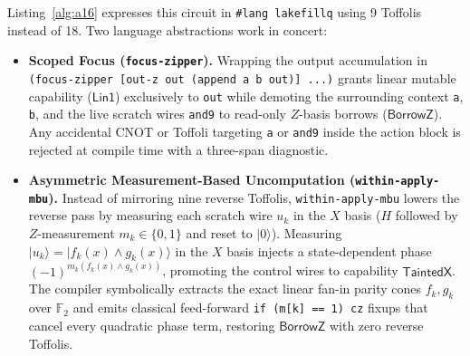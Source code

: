 \documentclass[acmsmall,screen,anonymous]{acmart}
\DeclareRobustCommand{\_}{\ifmmode\text{\char95}\else\char95\penalty0\relax\fi}
\theoremstyle{plain}
\newcommand{\CapBorrowZ}{\ensuremath{\mathsf{BorrowZ}}}
\newcommand{\CapTaintedX}{\ensuremath{\mathsf{TaintedX}}}
\newcommand{\CapLin}{\ensuremath{\mathsf{Lin1}}}
\begin{document}
Listing~\ref{alg:a16} expresses this circuit in \texttt{\#lang lakefillq} using 9 Toffolis instead of 18. Two language abstractions work in concert:
\begin{itemize}
  \item \textbf{Scoped Focus (\texttt{focus-zipper}).} Wrapping the output accumulation in \texttt{(focus-zipper [out-z out (append a b out)] ...)} grants linear mutable capability ($\CapLin$) exclusively to \texttt{out} while demoting the surrounding context \texttt{a}, \texttt{b}, and the live scratch wires \texttt{and9} to read-only $Z$-basis borrows ($\CapBorrowZ$). Any accidental CNOT or Toffoli targeting \texttt{a} or \texttt{and9} inside the action block is rejected at compile time with a three-span diagnostic.
  \item \textbf{Asymmetric Measurement-Based Uncomputation (\texttt{within-apply-mbu}).} Instead of mirroring nine reverse Toffolis, \texttt{within-apply-mbu} lowers the reverse pass by measuring each scratch wire $u_k$ in the $X$ basis ($H$ followed by $Z$-measurement $m_k \in \{0,1\}$ and reset to $|0\rangle$). Measuring $|u_k\rangle = |f_k(x) \land g_k(x)\rangle$ in the $X$ basis injects a state-dependent phase $(-1)^{m_k (f_k(x) \land g_k(x))}$, promoting the control wires to capability $\CapTaintedX$. The compiler symbolically extracts the exact linear fan-in parity cones $f_k, g_k$ over $\mathbb{F}_2$ and emits classical feed-forward \texttt{if (m[k] == 1) cz} fixups that cancel every quadratic phase term, restoring $\CapBorrowZ$ with zero reverse Toffolis.
\end{itemize}
\end{document}

